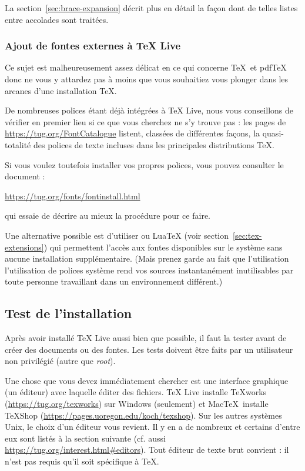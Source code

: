 \documentclass[german, english, french]{article}
\renewcommand{\TL}{\TeX{} Live\xspace}%
\newcommand\eng[1]{\foreignlanguage{english}{\emph{#1}}}
\begin{document}
La section~\ref{sec:brace-expansion} décrit plus en détail la façon dont de
telles listes entre accolades sont traitées.


\subsubsection{Ajout de fontes externes à \protect\TL{}}

Ce sujet est malheureusement assez délicat en ce qui concerne \TeX\ et pdf\TeX{}
donc ne vous y attardez pas à moins que vous souhaitiez vous plonger dans les
arcanes d'une installation \TeX{}.

De nombreuses polices étant déjà intégrées à \TL, nous vous conseillons de
vérifier en premier lieu si ce que vous cherchez ne s'y trouve pas : les pages
de \url{https://tug.org/FontCatalogue} listent, classées de différentes façons,
la quasi-totalité des polices de texte incluses dans les principales
distributions \TeX.

Si vous voulez toutefois installer vos propres polices, vous pouvez consulter le
document :

\url{https://tug.org/fonts/fontinstall.html}

qui essaie de décrire au mieux la procédure pour ce faire.

Une alternative possible est d'utiliser \XeTeX{} ou Lua\TeX{} (voir
section~\ref{sec:tex-extensions}) qui permettent l'accès aux fontes disponibles
sur le système sans aucune installation supplémentaire. (Mais prenez garde au
fait que l'utilisation l'utilisation de polices système rend vos sources
instantanément inutilisables par toute personne travaillant dans un
environnement différent.)

\subsection{Test de l'installation}
\label{sec:test-install}

Après avoir installé \TL{} aussi bien que possible, il faut la tester avant de
créer des documents ou des fontes.  Les tests doivent être faits par un
utilisateur non privilégié (autre que \eng{root}).

Une chose que vous devez immédiatement chercher est une interface graphique (un
éditeur) avec laquelle éditer des fichiers. \TL{} installe \TeX{}works
(\url{https://tug.org/texworks}) sur Windows (seulement) et Mac\TeX\ installe
TeXShop (\url{https://pages.uoregon.edu/koch/texshop}). Sur les autres systèmes
Unix, le choix d'un éditeur vous revient. Il y en a de nombreux et certains
d'entre eux sont listés à la section suivante (cf. aussi
\url{https://tug.org/interest.html#editors}). Tout éditeur de texte brut
convient : il n'est pas requis qu'il soit spécifique à \TeX{}.
\end{document}

